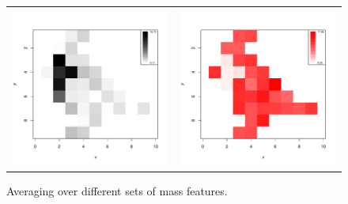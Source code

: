 \documentclass[a4paper]{article}
\begin{document}
\begin{figure}
\begin{center}
\begin{tabular}{cc}
\includegraphics{Cardinal-demo-033}
&
\includegraphics{Cardinal-demo-034}
\end{tabular}
\caption{\small Averaging over different sets of mass features.}
\end{center}
\end{figure}
\end{document}
